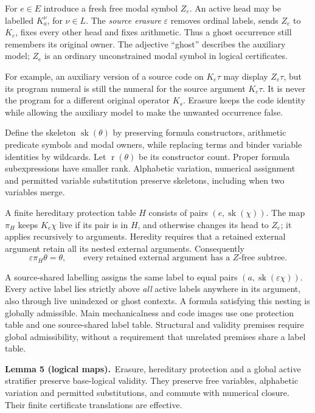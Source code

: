 \documentclass[11pt]{article}
\newcommand{\sk}{\operatorname{sk}}
\newcommand{\rk}{\operatorname{r}}
\newcommand{\eps}{\varepsilon}
\newcommand{\statement}[2]{\par\textbf{#1.}\ #2\par}
\begin{document}
For $e\in E$ introduce a fresh free modal symbol $Z_e$. An active head
may be labelled $K_a^\nu$, for $\nu\in L$. The \emph{source erasure}
$\eps$ removes ordinal labels, sends $Z_e$ to $K_e$, fixes every other
head and fixes arithmetic. Thus a ghost occurrence still remembers
its original owner. The adjective ``ghost'' describes the auxiliary
model; $Z_e$ is an ordinary unconstrained modal symbol in logical
certificates.

For example, an auxiliary version of a source code on $K_e\tau$ may
display $Z_e\tau$, but its program numeral is still the numeral for
the source argument $K_e\tau$. It is never the program for a different
original operator $K_s$. Erasure keeps the code identity while allowing
the auxiliary model to make the unwanted occurrence false.

Define the skeleton $\sk(\theta)$ by preserving formula constructors,
arithmetic predicate symbols and modal owners, while replacing terms
and binder variable identities by wildcards. Let $\rk(\theta)$ be
its constructor count. Proper formula subexpressions have smaller
rank. Alphabetic variation, numerical assignment and permitted variable
substitution preserve skeletons, including when two variables merge.

A finite hereditary protection table $H$ consists of pairs
$(e,\sk(\chi))$. The map $\pi_H$ keeps $K_e\chi$ live if its pair is
in $H$, and otherwise changes its head to $Z_e$; it applies recursively
to arguments. Heredity requires that a retained external argument
retain all its nested external arguments. Consequently
\begin{equation}\label{eq:erase-protect}
 \eps\pi_H\theta=\theta,
 \qquad\text{every retained external argument has a $Z$-free subtree.}
\end{equation}

A source-shared labelling assigns the same label to equal pairs
$(a,\sk(\eps\chi))$. Every active label lies strictly above
\emph{all} active labels anywhere in its argument, also through live
unindexed or ghost contexts. A formula satisfying this nesting is
globally admissible. Main mechanicalness and code images use one
protection table and one source-shared label table. Structural and
validity premises require global admissibility, without a requirement
that unrelated premises share a label table.

\statement{Lemma 5 (logical maps)}{Erasure, hereditary protection and
a global active stratifier preserve base-logical validity. They preserve
free variables, alphabetic variation and permitted substitutions, and
commute with numerical closure. Their finite certificate translations
are effective.}
\end{document}
